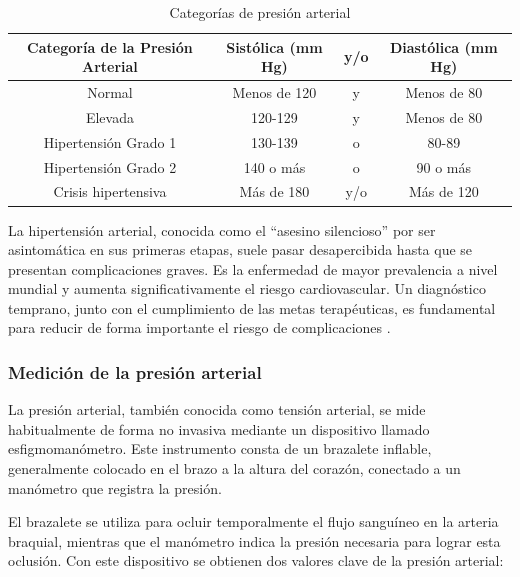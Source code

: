     \begin{table}[H]
        \begin{center}
            \begin{tabularx}{\columnwidth}{>{\raggedright\arraybackslash}c | c | c | c}
                \textbf{Categoría de la Presión Arterial} & \textbf{Sistólica (mm Hg)} & \textbf{y/o} & \textbf{Diastólica (mm Hg)}\\ \hline
                Normal & Menos de 120 & y & Menos de 80 \\
                Elevada & 120-129 & y & Menos de 80 \\
                Hipertensión Grado 1 & 130-139 & o & 80-89 \\
                Hipertensión Grado 2 & 140 o más & o & 90 o más \\
                Crisis hipertensiva & Más de 180 & y/o & Más de 120 \\
            \end{tabularx}
            \caption{Categorías de presión arterial}
            \label{tab:PA_categoria}
        \end{center}
    \end{table}

    La hipertensión arterial, conocida como el ``asesino silencioso'' por ser asintomática en sus primeras etapas, suele pasar desapercibida hasta que se presentan complicaciones graves. Es la enfermedad de mayor prevalencia a nivel mundial y aumenta significativamente el riesgo cardiovascular. Un diagnóstico temprano, junto con el cumplimiento de las metas terapéuticas, es fundamental para reducir de forma importante el riesgo de complicaciones \cite{archivosCardiologia_2016}.

        \subsubsection{Medición de la presión arterial}
        La presión arterial, también conocida como tensión arterial, se mide habitualmente de forma no invasiva mediante un dispositivo llamado esfigmomanómetro. Este instrumento consta de un brazalete inflable, generalmente colocado en el brazo a la altura del corazón, conectado a un manómetro que registra la presión.

        El brazalete se utiliza para ocluir temporalmente el flujo sanguíneo en la arteria braquial, mientras que el manómetro indica la presión necesaria para lograr esta oclusión. Con este dispositivo se obtienen dos valores clave de la presión arterial:

